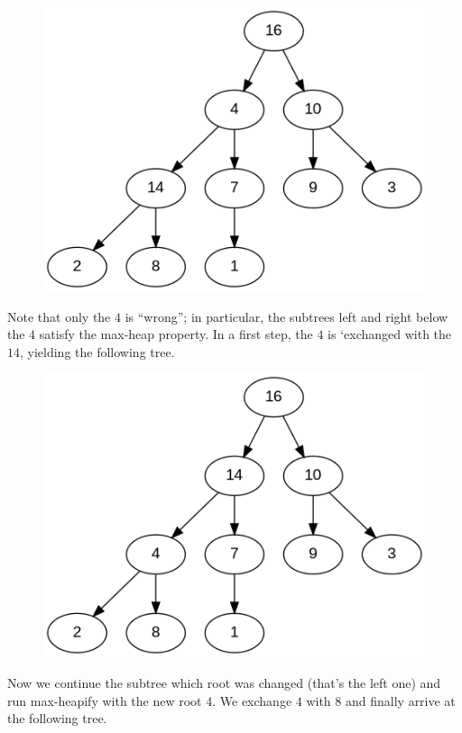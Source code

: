 \begin{figure}[H]
\centering
\includegraphics[scale=0.5]{images/heapsort_2.png}
\end{figure}

Note that only the $4$ is ``wrong''; in particular, the subtrees left and right below the $4$ satisfy the max-heap property. In a first step, the $4$ is `exchanged with the $14$, yielding the following tree.

\begin{figure}[H]
\centering
\includegraphics[scale=0.5]{images/heapsort_3.png}
\end{figure}

Now we continue the subtree which root was changed (that's the left one) and run max-heapify with the new root $4$. We exchange $4$ with $8$ and finally arrive at the following tree. 

